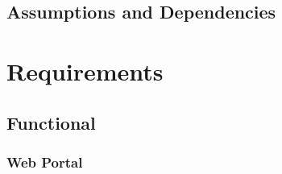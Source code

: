 \documentclass[11pt,a4paper]{article}
\begin{document}
\subsection{Assumptions and Dependencies}
\label{sec:assumptions-dependencies}

\section{Requirements}
\label{sec:requirements}
\subsection{Functional}
\label{sec:func-reqs}
\subsubsection{Web Portal}
\label{sec:req-reg-login}
\end{document}
